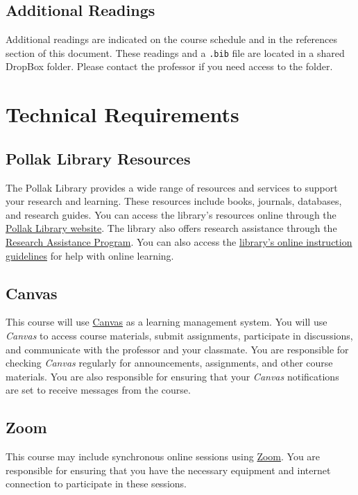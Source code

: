 \documentclass[12pt, letterpaper]{article}
\begin{document}
\subsection*{Additional Readings}

\noindent Additional readings are indicated on the course schedule and in the references section of this document. These readings and a \texttt{.bib} file are located in a shared DropBox folder. Please contact the professor if you need access to the folder.

\section{Technical Requirements}

\subsection*{Pollak Library Resources}

The Pollak Library provides a wide range of resources and services to support your research and learning. These resources include books, journals, databases, and research guides. You can access the library's resources online through the \href{http://www.library.fullerton.edu/}{Pollak Library website}. The library also offers research assistance through the \href{http://www.library.fullerton.edu/research/}{Research Assistance Program}. You can also access the \href{http://www.library.fullerton.edu/about/guidelines/online-instruction-guidelines.php}{library's online instruction guidelines} for help with online learning.

\subsection*{Canvas}

This course will use \href{https://csufullerton.instructure.com/}{Canvas} as a learning management system. You will use \emph{Canvas} to access course materials, submit assignments, participate in discussions, and communicate with the professor and your classmate. You are responsible for checking \emph{Canvas} regularly for announcements, assignments, and other course materials. You are also responsible for ensuring that your \emph{Canvas} notifications are set to receive messages from the course. 

\subsection*{Zoom}
This course may include synchronous online sessions using \href{https://fullerton.zoom.us/}{Zoom}. You are responsible for ensuring that you have the necessary equipment and internet connection to participate in these sessions. 
\end{document}
